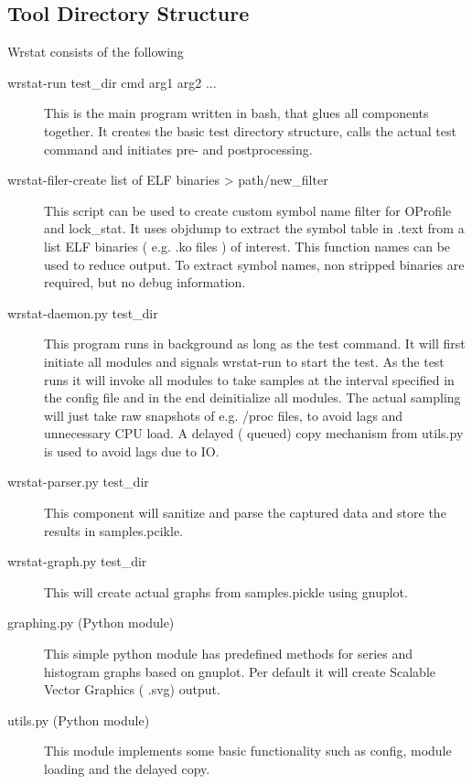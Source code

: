 \subsection{Tool Directory Structure}
    Wrstat consists of the following 
    \begin{description}
        \item[wrstat-run test\_dir cmd arg1 arg2 ...]
            This is the main program written in bash, that glues all components together.
            It creates the basic test directory structure, calls the actual test command
            and initiates pre- and postprocessing.

        \item[wrstat-filer-create list of ELF binaries > path/new\_filter]
            This script can be used to create custom symbol name filter for OProfile and lock\_stat.
            It uses objdump to extract the symbol table in .text from a list ELF binaries ( e.g. .ko files )
            of interest.
            This function names can be used to reduce output.
            To extract symbol names, non stripped binaries are required, but no debug information.


        \item[wrstat-daemon.py test\_dir]
            This program runs in background as long as the test command.
            It will first initiate all modules and signals wrstat-run to start the test.
            As the test runs it will invoke all modules to take samples at the interval
            specified in the config file and in the end deinitialize all modules.
            The actual sampling will just take raw snapshots of e.g. /proc files,
            to avoid lags and unnecessary CPU load.
            A delayed ( queued) copy mechanism from utils.py is used to avoid lags due to IO.

        \item[wrstat-parser.py test\_dir]
            This component will sanitize and parse the captured data and store the results in samples.pcikle.

        \item[wrstat-graph.py test\_dir]
            This will create actual graphs from samples.pickle using gnuplot.

        \item[graphing.py (Python module)]
            This simple python module has predefined methods for series and histogram graphs
            based on gnuplot.
            Per default it will create Scalable Vector Graphics ( .svg) output.

        \item[utils.py (Python module)]
            This module implements some basic functionality such as config, module loading
            and the delayed copy.

    \end{description}

